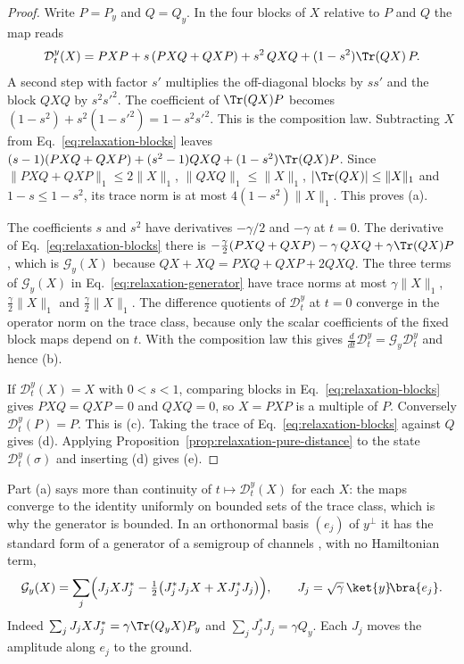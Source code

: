 \begin{proof}
Write $P=P_y$ and $Q=Q_y$. In the four blocks of $X$ relative to $P$ and $Q$ the map reads
\begin{equation}
 \mathcal D_t^y(X)=PXP+s\,(PXQ+QXP)+s^2\,QXQ+(1-s^2)\Tr(QX)\,P .
 \label{eq:relaxation-blocks}
\end{equation}
A second step with factor $s'$ multiplies the off-diagonal blocks by $ss'$ and the block $QXQ$ by $s^2s'^2$. The coefficient of $\Tr(QX)P$ becomes $(1-s^2)+s^2(1-s'^2)=1-s^2s'^2$. This is the composition law. Subtracting $X$ from Eq.~\eqref{eq:relaxation-blocks} leaves $(s-1)(PXQ+QXP)+(s^2-1)QXQ+(1-s^2)\Tr(QX)P$. Since $\|PXQ+QXP\|_1\le2\|X\|_1$, $\|QXQ\|_1\le\|X\|_1$, $|\Tr(QX)|\le\|X\|_1$ and $1-s\le1-s^2$, its trace norm is at most $4(1-s^2)\|X\|_1$. This proves (a).

The coefficients $s$ and $s^2$ have derivatives $-\gamma/2$ and $-\gamma$ at $t=0$. The derivative of Eq.~\eqref{eq:relaxation-blocks} there is $-\tfrac{\gamma}{2}(PXQ+QXP)-\gamma\,QXQ+\gamma\Tr(QX)P$, which is $\mathcal G_y(X)$ because $QX+XQ=PXQ+QXP+2QXQ$. The three terms of $\mathcal G_y(X)$ in Eq.~\eqref{eq:relaxation-generator} have trace norms at most $\gamma\|X\|_1$, $\tfrac{\gamma}{2}\|X\|_1$ and $\tfrac{\gamma}{2}\|X\|_1$. The difference quotients of $\mathcal D_t^y$ at $t=0$ converge in the operator norm on the trace class, because only the scalar coefficients of the fixed block maps depend on $t$. With the composition law this gives $\tfrac{d}{dt}\mathcal D_t^y=\mathcal G_y\mathcal D_t^y$ and hence (b).

If $\mathcal D_t^y(X)=X$ with $0<s<1$, comparing blocks in Eq.~\eqref{eq:relaxation-blocks} gives $PXQ=QXP=0$ and $QXQ=0$, so $X=PXP$ is a multiple of $P$. Conversely $\mathcal D_t^y(P)=P$. This is (c). Taking the trace of Eq.~\eqref{eq:relaxation-blocks} against $Q$ gives (d). Applying Proposition~\ref{prop:relaxation-pure-distance} to the state $\mathcal D_t^y(\sigma)$ and inserting (d) gives (e).
\end{proof}

Part (a) says more than continuity of $t\mapsto\mathcal D_t^y(X)$ for each $X$: the maps converge to the identity uniformly on bounded sets of the trace class, which is why the generator is bounded. In an orthonormal basis $(e_j)$ of $y^\perp$ it has the standard form of a generator of a semigroup of channels \cite{GKS1976,Lindblad1976}, with no Hamiltonian term,
\begin{equation}
 \mathcal G_y(X)=\sum_j\Bigl(J_jXJ_j^*-\tfrac12\bigl(J_j^*J_jX+XJ_j^*J_j\bigr)\Bigr),
 \qquad J_j=\sqrt\gamma\,\ket{y}\!\bra{e_j}.
 \label{eq:relaxation-jumps}
\end{equation}
Indeed $\sum_jJ_jXJ_j^*=\gamma\Tr(Q_yX)P_y$ and $\sum_jJ_j^*J_j=\gamma Q_y$. Each $J_j$ moves the amplitude along $e_j$ to the ground.

